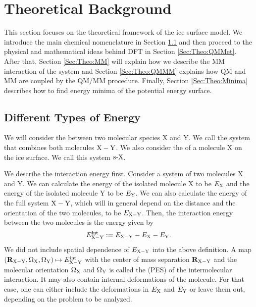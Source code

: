 \section{Theoretical Background}
\label{Sec:Theo}
This section focuses on the theoretical framework of the ice surface model. We introduce the main chemical
nomenclature in Section \ref{Sec:Theo:Interaction} and then proceed to the
physical and mathematical ideas behind DFT in Section \ref{Sec:Theo:QMMet}.
After that, Section \ref{Sec:Theo:MM} will explain how we describe the MM
interaction of the system and Section \ref{Sec:Theo:QMMM} explains how QM and
MM are coupled by the QM/MM procedure. Finally, Section \ref{Sec:Theo:Minima}
describes how to find energy minima of the potential energy surface.

\newcommand\X{\enmat{\te X}}
\newcommand\Y{\enmat{\te Y}}
\newcommand\Z{\enmat{\te Z}}
\newcommand\XY{{\enmat{{\X - \Y}}}}
\renewcommand\S{\enmat{\te S}}
\newcommand\sX{\enmat{{\sur\te{X}}}}
\newcommand\A{\enmat{\te A}}
\subsection{Different Types of Energy}
\label{Sec:Theo:Interaction}
We will consider the  between two molecular species X and Y. We call
the system that combines both molecules $\XY$. We also consider the
 of a molecule X on the ice surface. We call this system $\sX$.

We describe the interaction energy first.
Consider a system of two molecules X and Y. We can calculate the energy of the isolated molecule X to
be $E_{\text X}$ and the energy of the isolated molecule Y to be $E_{\text Y}$. We can also calculate the 
energy of the full system $\XY$, which will in general depend on the distance and the orientation
of the two molecules, to be $E_{\XY}$. Then, the interaction energy between the two molecules
is the energy given by
\begin{equation}
 \eint_{\XY} := E_{\XY} - E_\X - E_\Y.
 \label{Theo:InteractionEnergy}
\end{equation}
We did not include spatial dependence of $E_{\XY}$ into the above definition. A
map \mbox{$(\bo R_\XY, \Om_\X, \Om_\Y) \mapsto \eint_\XY$} with the center of
mass separation $\bo R_\XY$ and the molecular orientation $\Om_\X$ and $\Om_\Y$
is called the  (PES) of the intermolecular interaction. It may also contain internal deformations of
the molecule. For that case, one can either include the deformations in $E_\X$
and $E_\Y$ or leave them out, depending on the problem to be analyzed.

